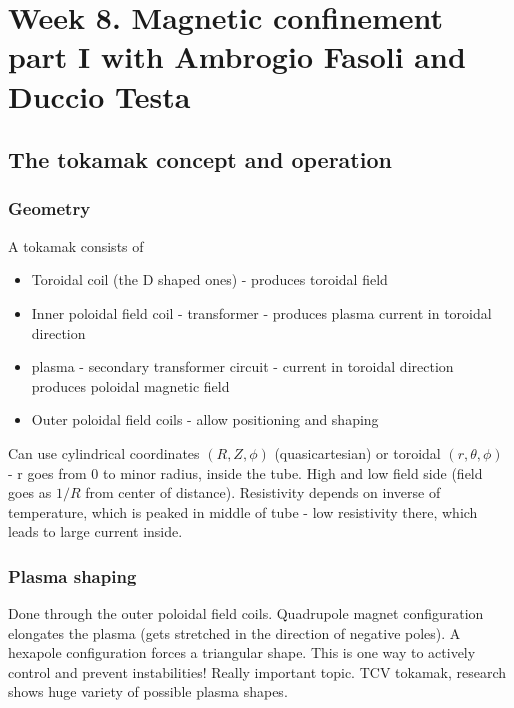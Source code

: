 \documentclass[PlasmaNotes.tex]{subfiles}
\begin{document}
\setcounter{section}{7}
\let\oldexp\exp
\renewcommand{\exp}[1]{\oldexp(#1)}
\newcommand{\png}[1]{\begin{center}\texttt{[image: \#1]}\end{center}}
\newcommand{\largepng}[1]{\begin{center}\texttt{[image: \#1]}\end{center}}
\newcommand{\goesto}{\rightarrow}
\section{Week 8. Magnetic confinement part I with Ambrogio Fasoli and Duccio Testa}

\subsection{The tokamak concept and operation}

  \subsubsection{Geometry}

    A tokamak consists of

    \begin{itemize}
    \item Toroidal coil (the D shaped ones) - produces toroidal field
    \item Inner poloidal field coil - transformer - produces plasma current in toroidal direction
    \item plasma - secondary transformer circuit - current in toroidal direction produces poloidal magnetic field
    \item Outer poloidal field coils - allow positioning and shaping
    \end{itemize}

    Can use cylindrical coordinates $(R,Z,\phi)$ (quasicartesian) or toroidal $(r, \theta, \phi)$  - r goes from 0 to minor radius, inside the tube. High and low field side (field goes as $1/R$ from center of distance). Resistivity depends on inverse of temperature, which is peaked in middle of tube - low resistivity there, which leads to large current inside.

  \subsubsection{Plasma shaping}
    
    Done through the outer poloidal field coils. Quadrupole magnet configuration elongates the plasma (gets stretched in the direction of negative poles). A hexapole configuration forces a triangular shape. This is one way to actively control and prevent instabilities! Really important topic.
    TCV tokamak, research shows huge variety of possible plasma shapes.
    
\end{document}
